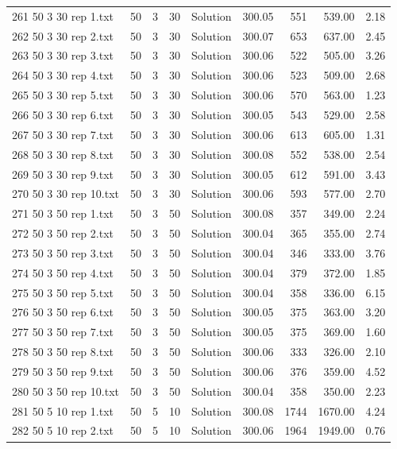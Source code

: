 \begin{longtable}{lrrllrrrr}
261 50 3 30 rep 1.txt & 50 & 3 & 30 & Solution & 300.05 & 551 & 539.00 &  2.18\\
262 50 3 30 rep 2.txt & 50 & 3 & 30 & Solution & 300.07 & 653 & 637.00 &  2.45\\
263 50 3 30 rep 3.txt & 50 & 3 & 30 & Solution & 300.06 & 522 & 505.00 &  3.26\\
264 50 3 30 rep 4.txt & 50 & 3 & 30 & Solution & 300.06 & 523 & 509.00 &  2.68\\
265 50 3 30 rep 5.txt & 50 & 3 & 30 & Solution & 300.06 & 570 & 563.00 &  1.23\\
266 50 3 30 rep 6.txt & 50 & 3 & 30 & Solution & 300.05 & 543 & 529.00 &  2.58\\
267 50 3 30 rep 7.txt & 50 & 3 & 30 & Solution & 300.06 & 613 & 605.00 &  1.31\\
268 50 3 30 rep 8.txt & 50 & 3 & 30 & Solution & 300.08 & 552 & 538.00 &  2.54\\
269 50 3 30 rep 9.txt & 50 & 3 & 30 & Solution & 300.05 & 612 & 591.00 &  3.43\\
270 50 3 30 rep 10.txt & 50 & 3 & 30 & Solution & 300.06 & 593 & 577.00 &  2.70\\
271 50 3 50 rep 1.txt & 50 & 3 & 50 & Solution & 300.08 & 357 & 349.00 &  2.24\\
272 50 3 50 rep 2.txt & 50 & 3 & 50 & Solution & 300.04 & 365 & 355.00 &  2.74\\
273 50 3 50 rep 3.txt & 50 & 3 & 50 & Solution & 300.04 & 346 & 333.00 &  3.76\\
274 50 3 50 rep 4.txt & 50 & 3 & 50 & Solution & 300.04 & 379 & 372.00 &  1.85\\
275 50 3 50 rep 5.txt & 50 & 3 & 50 & Solution & 300.04 & 358 & 336.00 &  6.15\\
276 50 3 50 rep 6.txt & 50 & 3 & 50 & Solution & 300.05 & 375 & 363.00 &  3.20\\
277 50 3 50 rep 7.txt & 50 & 3 & 50 & Solution & 300.05 & 375 & 369.00 &  1.60\\
278 50 3 50 rep 8.txt & 50 & 3 & 50 & Solution & 300.06 & 333 & 326.00 &  2.10\\
279 50 3 50 rep 9.txt & 50 & 3 & 50 & Solution & 300.06 & 376 & 359.00 &  4.52\\
280 50 3 50 rep 10.txt & 50 & 3 & 50 & Solution & 300.04 & 358 & 350.00 &  2.23\\
281 50 5 10 rep 1.txt & 50 & 5 & 10 & Solution & 300.08 & 1744 & 1670.00 &  4.24\\
282 50 5 10 rep 2.txt & 50 & 5 & 10 & Solution & 300.06 & 1964 & 1949.00 &  0.76\\

\end{longtable}
